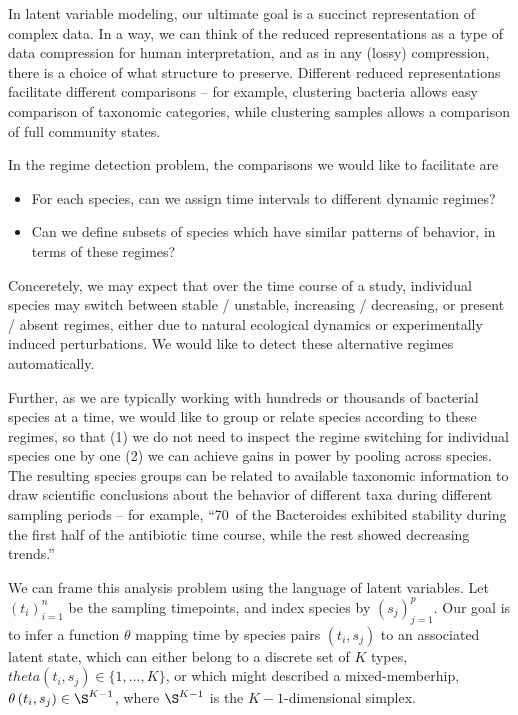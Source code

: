 \documentclass{article}
\begin{document}
In latent variable modeling, our ultimate goal is a succinct representation of
complex data. In a way, we can think of the reduced representations as a type of
data compression for human interpretation, and as in any (lossy) compression,
there is a choice of what structure to preserve. Different reduced
representations facilitate different comparisons -- for example, clustering
bacteria allows easy comparison of taxonomic categories, while clustering
samples allows a comparison of full community states.

In the regime detection problem, the comparisons we would like to facilitate are
\begin{itemize}
\item For each species, can we assign time intervals to different dynamic
  regimes?
\item Can we define subsets of species which have similar patterns of behavior,
  in terms of these regimes?
\end{itemize}

Conceretely, we may expect that over the time course of a study, individual
species may switch between stable / unstable, increasing / decreasing, or
present / absent regimes, either due to natural ecological dynamics or
experimentally induced perturbations. We would like to detect these alternative
regimes automatically.

Further, as we are typically working with hundreds or thousands of bacterial
species at a time, we would like to group or relate species according to these
regimes, so that (1) we do not need to inspect the regime switching for
individual species one by one (2) we can achieve gains in power by pooling
across species. The resulting species groups can be related to available taxonomic
information to draw scientific conclusions about the behavior of different
taxa during different sampling periods -- for example, ``70\ of the Bacteroides
exhibited stability during the first half of the antibiotic time course, while
the rest showed decreasing trends.''

We can frame this analysis problem using the language of latent variables. Let
$\left(t_{i}\right)_{i = 1}^{n}$ be the sampling timepoints, and index species by
$\left(s_{j}\right)_{j = 1}^{p}$. Our goal is to infer a function $\theta$
mapping time by species pairs $\left(t_{i}, s_{j}\right)$ to an associated
latent state, which can either belong to a discrete set of $K$ types,
$theta\left(t_{i}, s_{j}\right) \in \{1, \dots, K\}$, or which might described a
mixed-memberhip, $\theta\left(t_{i}, s_{j}\right) \in \S^{K - 1}$, where
$\S^{K - 1}$ is the $K - 1$-dimensional simplex.
\end{document}

